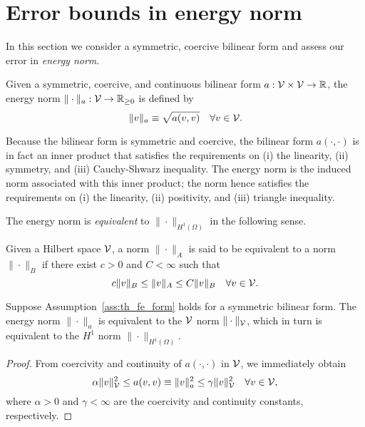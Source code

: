 \section{Error bounds in energy norm}
In this section we consider a symmetric, coercive bilinear form and assess our error in \emph{energy norm}.
\begin{definition}
  Given a symmetric, coercive, and continuous bilinear form $a: \mathcal{V} \times \mathcal{V} \to \mathbb{R}$, the energy norm $\| \cdot \|_a : \mathcal{V} \to \mathbb{R}_{\geq 0}$ is defined by
  \begin{equation*}
    \| v \|_a \equiv \sqrt{a(v,v)} \quad \forall v \in \mathcal{V}.
  \end{equation*}
\end{definition}
Because the bilinear form is symmetric and coercive, the bilinear form $a(\cdot,\cdot)$ is in fact an inner product that satisfies the requirements on (i) the linearity, (ii) symmetry, and (iii) Cauchy-Shwarz inequality.  The energy norm is the induced norm associated with this inner product; the norm hence satisfies the requirements on (i) the linearity, (ii) positivity, and (iii) triangle inequality.

The energy norm is \emph{equivalent} to $\| \cdot \|_{H^1(\Omega)}$ in the following sense.
\begin{definition}
  Given a Hilbert space $\mathcal{V}$, a norm $\| \cdot \|_A$ is said to be equivalent to a norm $\| \cdot \|_B$ if there exist $c > 0$ and $C < \infty$ such that
  \begin{equation*}
    c \| v \|_{B} \leq \| v \|_A \leq C \| v \|_{B} \quad \forall v \in \mathcal{V}.
  \end{equation*}
\end{definition}
\begin{lemma}
  Suppose Assumption~\ref{ass:th_fe_form} holds for a symmetric bilinear form.  The energy norm $\| \cdot \|_a$ is equivalent to the $\mathcal{V}$ norm $\| \cdot \|_{\mathcal{V}}$, which in turn is equivalent to the $H^1$ norm $\| \cdot \|_{H^1(\Omega)}$.
  \begin{proof}
    From coercivity and continuity of $a(\cdot,\cdot)$ in $\mathcal{V}$, we immediately obtain
    \begin{equation*}
      \alpha \| v \|_{\mathcal{V}}^2 \leq a(v,v) \equiv \| v \|_a^2 \leq \gamma \| v \|_{\mathcal{V}}^2 \quad \forall v \in \mathcal{V},
    \end{equation*}
    where $\alpha > 0$ and $\gamma < \infty$ are the coercivity and continuity constants, respectively. %
  \end{proof}
\end{lemma}

